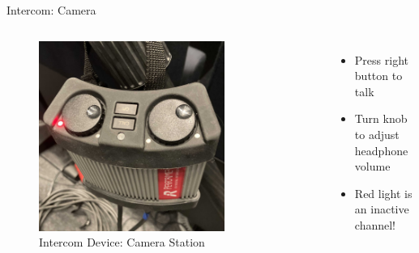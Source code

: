 \begin{frame}{Intercom: Camera}
	\begin{columns}[T,onlytextwidth]
		\begin{figure}
			\centering
			\includegraphics[width=0.75\textwidth]{images/riedel-intercom-artist.jpg}
			\caption{Intercom Device: Camera Station}
		\end{figure}

		\begin{itemize}
			\item Press right button to talk
			\item Turn knob to adjust headphone volume
			\item Red light is an inactive channel!
		\end{itemize}
	\end{columns}
\end{frame}
